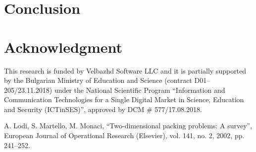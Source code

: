 \documentclass[conference]{IEEEtran}
\begin{document}
\section{Conclusion}

\section*{Acknowledgment}

This research is funded by Velbazhd Software LLC and it is partially supported by the Bulgarian Ministry of Education and Science (contract D01–205/23.11.2018) under the National Scientific Program ``Information and Communication Technologies for a Single Digital Market in Science, Education and Security (ICTinSES)'', approved by DCM \# 577/17.08.2018.

\begin{thebibliography}{00}

 A. Lodi, S. Martello, M. Monaci, ``Two-dimensional packing problems: A survey'', European Journal of Operational Research (Elsevier), vol. 141, no. 2, 2002, pp. 241--252.

\end{thebibliography}
\end{document}

